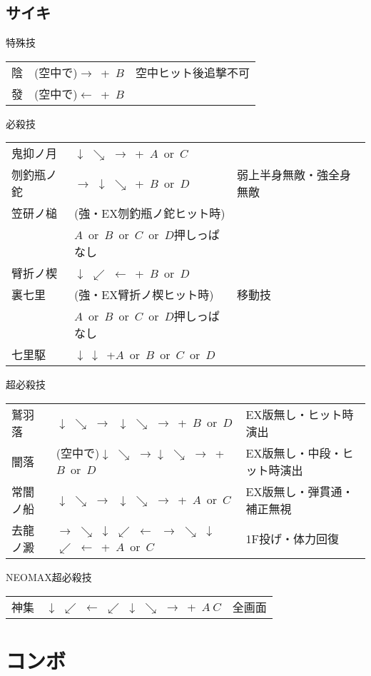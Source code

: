 \documentclass[a4j,11pt]{jarticle}
\def\hado{$\downarrow$ $\searrow$ $\rightarrow$}%
\def\tatsu{$\downarrow$ $\swarrow$ $\leftarrow$}%
\def\syoryu{$\rightarrow$ $\downarrow$ $\searrow$}%
\def\gyakuyoga{$\rightarrow$ $\searrow$ $\downarrow$ $\swarrow$ $\leftarrow$}%
\def\orochi{$\downarrow$ $\swarrow$ $\leftarrow$ $\swarrow$ $\downarrow$ $\searrow$ $\rightarrow$}%
\begin{document}
\subsection{サイキ}
\begin{itembox}[l]{特殊技}
\begin{tabular}{lll}
陰&(空中で)$\rightarrow$\ +\ $B$&空中ヒット後追撃不可\\%
發&(空中で)$\leftarrow$\ +\ $B$&
\end{tabular}
\end{itembox}
\begin{itembox}[l]{必殺技}
\begin{tabular}{lll}
鬼抑ノ月&\hado\ +\ $A$\ or\ $C$&\\%
刎釣瓶ノ鉈&\syoryu\ +\ $B$\ or\ $D$&弱上半身無敵・強全身無敵\\%
笠研ノ槌&(強・EX刎釣瓶ノ鉈ヒット時)&\\
&$A$\ or\ $B$\ or\ $C$\ or\ $D$押しっぱなし&\\%
臂折ノ楔&\tatsu\ +\ $B$\ or\ $D$&\\%
裏七里&(強・EX臂折ノ楔ヒット時)&移動技\\%
&$A$\ or\ $B$\ or\ $C$\ or\ $D$押しっぱなし&\\%
七里駆&$\downarrow\ \downarrow$\ +$A$\ or\ $B$\ or\ $C$\ or\ $D$&%
\end{tabular}
\end{itembox}
\begin{itembox}[l]{超必殺技}
\begin{tabular}{lll}
鷲羽落&\hado\ \hado\ +\ $B$\ or\ $D$&EX版無し・ヒット時演出\\%
闇落&(空中で)\hado \hado\ +\ $B$\ or\ $D$&EX版無し・中段・ヒット時演出\\%
常闇ノ船&\hado\ \hado\ +\ $A$\ or\ $C$&EX版無し・弾貫通・補正無視\\%
去龍ノ澱&\gyakuyoga\ \gyakuyoga\ +\ $A$\ or\ $C$&1F投げ・体力回復\\%
\end{tabular}
\end{itembox}
\begin{itembox}[l]{NEOMAX超必殺技}
\begin{tabular}{lll}
神集&\orochi\ +\ $A\ C$&全画面%
\end{tabular}
\end{itembox}
\newpage
\section{コンボ}
\end{document}
